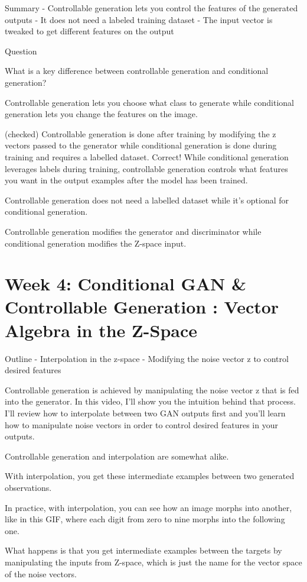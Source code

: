 \documentclass[11pt, onecolumn]{article}
\begin{document}
Summary
- Controllable generation lets you control the features of the generated outputs
- It does not need a labeled training dataset
- The input vector is tweaked to get different features on the output

Question

What is a key difference between controllable generation and conditional generation?

Controllable generation lets you choose what class to generate while conditional generation lets you change the features on the image.

(checked) Controllable generation is done after training by modifying the z vectors passed to the generator while conditional generation is done during training and requires a labelled dataset.
Correct! While conditional generation leverages labels during training, controllable generation controls what features you want in the output examples after the model has been trained.

Controllable generation does not need a labelled dataset while it’s optional for conditional generation.

Controllable generation modifies the generator and discriminator while conditional generation modifies the Z-space input.

\section{Week 4: Conditional GAN \& Controllable Generation : Vector Algebra in the Z-Space}

Outline
- Interpolation in the z-space
- Modifying the noise vector z to control desired features

Controllable generation is achieved by manipulating the noise vector z that is fed into the generator.
In this video, I'll show you
the intuition behind that process.
I'll review how to interpolate between
two GAN outputs first and you'll learn how
to manipulate noise vectors in order to
control desired features in your outputs.

Controllable generation and interpolation are somewhat alike.

With interpolation, you get these intermediate examples between two generated observations.

In practice, with interpolation, you can see how an image morphs into another, like in this GIF, where each digit from zero to nine morphs into the following one.

What happens is that you get intermediate examples between the targets by manipulating the inputs from Z-space, which is just the name for the vector space of the noise vectors.
\end{document}

